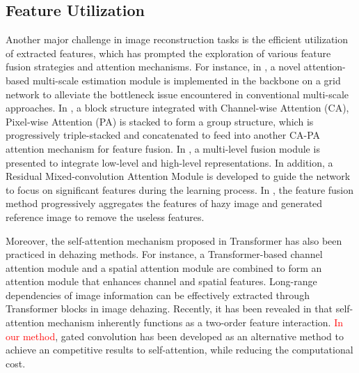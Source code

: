 \documentclass[lettersize,journal]{IEEEtran}
\begin{document}
\subsection{Feature Utilization}
\label{subsec:2.2}
Another major challenge in image reconstruction tasks is the efficient utilization of extracted features, which has prompted the exploration of various feature fusion strategies and attention mechanisms. For instance, in \cite{liu2019griddehazenet}, a novel attention-based multi-scale estimation module is implemented in the backbone on a grid network to alleviate the bottleneck issue encountered in conventional multi-scale approaches. In \cite{qin2020ffa}, a block structure integrated with Channel-wise Attention (CA), Pixel-wise Attention (PA) is stacked to form a group structure, which is progressively triple-stacked and concatenated to feed into another CA-PA attention mechanism for feature fusion. In \cite{zhang2020multi}, a multi-level fusion module is presented to integrate low-level and high-level representations. In addition, a Residual Mixed-convolution Attention Module is developed to guide the network to focus on significant features during the learning process. In \cite{2022selfguided}, the feature fusion method progressively aggregates the features of hazy image and generated reference image to remove the useless features.

Moreover, the self-attention mechanism proposed in Transformer has also been practiced in dehazing methods. For instance, a Transformer-based channel attention module and a spatial attention module are combined to form an attention module that enhances channel and spatial features\cite{gao2022novel}. Long-range dependencies of image information can be effectively extracted through Transformer blocks in image dehazing\cite{yang2022mstfdn}. Recently, it has been revealed in \cite{rao2022hornet} that self-attention mechanism inherently functions as a two-order feature interaction. \textcolor{red}{In our method}, gated convolution has been developed as an alternative method to achieve an competitive results to self-attention, while reducing the computational cost. 
\end{document}
